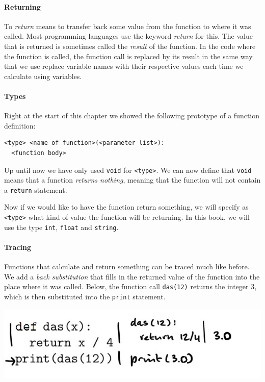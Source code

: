 \paragraph{Returning}

To \emph{return} means to transfer back some value from the function to where it was called. Most programming languages use the keyword \emph{return} for this. The value that is returned is sometimes called the \emph{result} of the function. In the code where the function is called, the function call is replaced by its result in the same way that we use replace variable names with their respective values each time we calculate using variables.

\paragraph{Types}

Right at the start of this chapter we showed the following prototype of a function definition:

\begin{verbatim}
<type> <name of function>(<parameter list>):
  <function body>
\end{verbatim}

Up until now we have only used \texttt{void} for \texttt{<type>}. We can now define that \texttt{void} means that a function \emph{returns nothing}, meaning that the function will not contain a \texttt{return} statement.

Now if we would like to have the function return something, we will specify as \texttt{<type>} what kind of value the function will be returning. In this book, we will use the type \texttt{int}, \texttt{float} and \texttt{string}.

\paragraph{Tracing}

Functions that calculate and return something can be traced much like before. We add a \emph{back substitution} that fills in the returned value of the function into the place where it was called. Below, the function call \texttt{das(12)} returns the integer 3, which is then substituted into the \texttt{print} statement.

\includegraphics[width=.7\textwidth]{6-trace-returns.jpeg}
